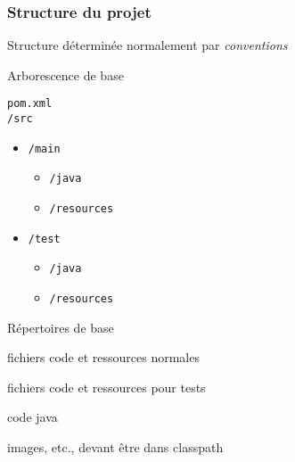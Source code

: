 \documentclass[english, french]{beamer}
\begin{document}
\begin{frame}
	\frametitle{Structure du projet}
	Structure déterminée {\tiny normalement} par \emph{conventions}
	\vfill
	\begin{minipage}[t]{3.5cm}
		{\centering Arborescence de base\par}
		\vspace{1ex}
		\texttt{pom.xml}\\
		\texttt{/src}
		\begin{itemize}
			\item[] \texttt{/main}
			\begin{itemize}
				\item[] \texttt{/java}
			\end{itemize}\vspace{-0.8ex}
			\begin{itemize}
				\item[] \texttt{/resources}
			\end{itemize}\vspace{-0.8ex}
			\item[] \texttt{/test}
			\begin{itemize}
				\item[] \texttt{/java}
			\end{itemize}\vspace{-0.8ex}
			\begin{itemize}
				\item[] \texttt{/resources}
			\end{itemize}\vspace{-0.8ex}
		\end{itemize}
	\end{minipage}\hfill%
	\begin{minipage}[t]{6.5cm}
		{\centering Répertoires de base\par}
		\begin{description}
			\item[\texttt{/src/main/…}] fichiers code et ressources \og{}normales\fg{}
			\item[\texttt{/src/test/…}] fichiers code et ressources pour tests
			\item[\texttt{…/java}] code java
			\item[\texttt{…/resources}] images, etc., devant être dans classpath
		\end{description}
	\end{minipage}
\end{frame}
\end{document}
